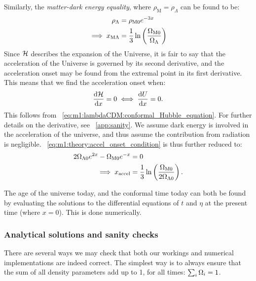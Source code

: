      Similarly, the \textit{matter-dark energy equality}, where $\rho_\mathrm{M}=\rho_\Lambda$ can be found to be:
     \begin{equation}\label{eq:m1:theory:equalities:matter_dark_energy}
        \begin{split}
            \rho_\Lambda &= \rho_\mathrm{M0}e^{-3x} \\
            \implies x_{\mathrm{M}\Lambda} &= \frac{1}{3}\ln\left(\frac{\Omega_\mathrm{M0}}{\Omega_\Lambda}\right)
        \end{split}
     \end{equation}
     Since $\mathcal{H}$ describes the expansion of the Universe, it is fair to say that the acceleration of the Universe is governed by its second derivative, and the acceleration onset may be found from the extremal point in its first derivative. This means that we find the acceleration onset when:
     \begin{equation}\label{eq:m1:theory:accel_onset_condition}
        \dv{\mathcal{H}}{x} = 0 \iff \dv{U}{x} = 0.
     \end{equation}
     This follows from ~\cref{eq:m1:lambdaCDM:conformal_Hubble_equation}. For further details on the derivative, see ~\cref{app:sanity}. We assume dark energy is involved in the acceleration of the universe, and thus assume the contribution from radiation is negligible. ~\cref{eq:m1:theory:accel_onset_condition} is thus further reduced to:
     \begin{equation}\label{eq:m1:theory:accel_onset_definiton}
        \begin{split}
            2\Omega_{\Lambda0}e^{2x} - \Omega_\mathrm{M0}e^{-x}&=0\\
            \implies x_\mathrm{accel}&=\frac{1}{3}\ln\left(\frac{\Omega_\mathrm{M0}}{2\Omega_{\Lambda0}}\right).
        \end{split}
     \end{equation}
    
    The age of the universe today, and the conformal time today can both be found by evaluating the solutions to the differential equations of $t$ and $\eta$ at the present time (where $x=0$). This is done numerically. 

\subsubsection{Analytical solutions and sanity checks}\label{sec:m1:theory:sanity}
    There are several ways we may check that both our workings and numerical implementations are indeed correct. The simplest way is to always ensure that the sum of all density parameters add up to 1, for all times: $\sum_i\Omega_i=1$. 
    
